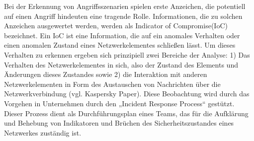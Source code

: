 Bei der Erkennung von Angriffsszenarien spielen erste Anzeichen, die potentiell auf einen Angriff hindeuten eine tragende Rolle. Informationen, die zu solchen Anzeichen ausgewertet werden, werden als \glqq Indicator of Compromise\grqq  (IoC) bezeichnet. Ein IoC ist eine Information, die auf ein anomales Verhalten oder einen anomalen Zustand eines Netzwerkelementes schließen lässt. Um dieses Verhalten zu erkennen ergeben sich prinzipiell zwei Bereiche der Analyse: 1) Das Verhalten des Netzwerkelementes in sich, also der Zustand des Elements und Änderungen dieses Zustandes sowie 2) die Interaktion mit anderen Netzwerkelementen in Form des Austauschen von Nachrichten über die Netzwerkverbindung (vgl. Kaspersky Paper). 
Diese Beobachtung wird durch das Vorgehen in Unternehmen durch den „Incident Response Process“ gestützt. Dieser Prozess dient als Durchführungsplan eines Teams, das für die Aufklärung und Behebung von Indikatoren und Brüchen des Sicherheitszustandes eines Netzwerkes zuständig ist. 

